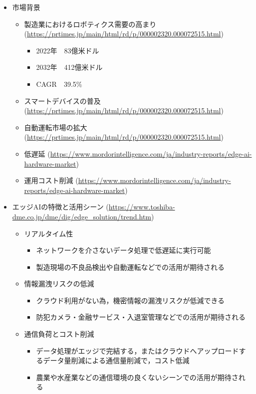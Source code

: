 \begin{itemize}
	\item 市場背景
	\begin{itemize}
		\item 製造業におけるロボティクス需要の高まり (\url{https://prtimes.jp/main/html/rd/p/000002320.000072515.html})
		\begin{itemize}
			\item 2022年　83億米ドル
			\item 2032年　412億米ドル
			\item CAGR　39.5\%
		\end{itemize}
		\item スマートデバイスの普及 (\url{https://prtimes.jp/main/html/rd/p/000002320.000072515.html})
		\item 自動運転市場の拡大 (\url{https://prtimes.jp/main/html/rd/p/000002320.000072515.html})
		\item 低遅延 (\url{https://www.mordorintelligence.com/ja/industry-reports/edge-ai-hardware-market})
		\item 運用コスト削減 (\url{https://www.mordorintelligence.com/ja/industry-reports/edge-ai-hardware-market})
	\end{itemize}
	\item エッジAIの特徴と活用シーン (\url{https://www.toshiba-dme.co.jp/dme/dig/edge_solution/trend.htm})
	\begin{itemize}
		\item リアルタイム性
		\begin{itemize}
			\item ネットワークを介さないデータ処理で低遅延に実行可能
			\item 製造現場の不良品検出や自動運転などでの活用が期待される
		\end{itemize}
		\item 情報漏洩リスクの低減
		\begin{itemize}
			\item クラウド利用がない為，機密情報の漏洩リスクが低減できる
			\item 防犯カメラ・金融サービス・入退室管理などでの活用が期待される
		\end{itemize}
		\item 通信負荷とコスト削減
		\begin{itemize}
			\item データ処理がエッジで完結する，またはクラウドへアップロードするデータ量削減による通信量削減で，コスト低減
			\item 農業や水産業などの通信環境の良くないシーンでの活用が期待される

\end{itemize}
\end{itemize}
\end{itemize}
